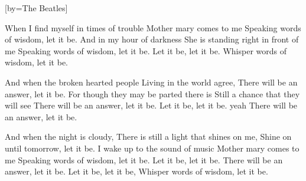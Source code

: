 [by={The Beatles}]

\beginverse
When I find myself in times of trouble
Mother mary comes to me
Speaking words of wisdom, let it be.
And in my hour of darkness
She is standing right in front of me
Speaking words of wisdom, let it be.
Let it be, let it be.
Whisper words of wisdom, let it be.
\endverse

\beginverse
And when the broken hearted people
Living in the world agree,
There will be an answer, let it be.
For though they may be parted there is
Still a chance that they will see
There will be an answer, let it be.
Let it be, let it be. yeah
There will be an answer, let it be.
\endverse

\beginverse
And when the night is cloudy,
There is still a light that shines on me,
Shine on until tomorrow, let it be.
I wake up to the sound of music
Mother mary comes to me
Speaking words of wisdom, let it be.
Let it be, let it be.
There will be an answer, let it be.
Let it be, let it be,
Whisper words of wisdom, let it be.
\endverse
\endsong




